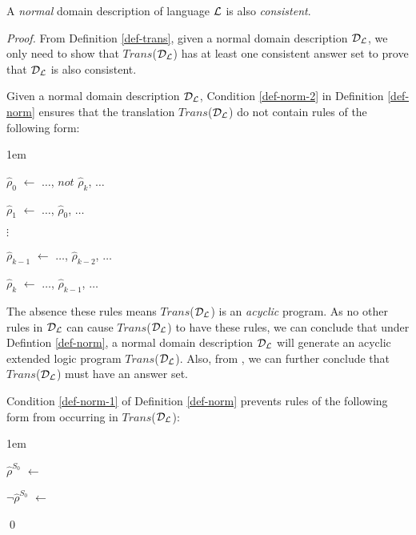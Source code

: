 \documentclass[global,twocolumn,final]{svjour}
\newenvironment{vtheorem}[1]
  {\begin{theorem}[#1]\hspace{0.25em}}
  {\end{theorem}}
\newenvironment{vproof}
  {\begin{proof}\hspace{0.25em}}
  {\qed\end{proof}}
\newenvironment{vquote}
  {\begin{list}{}{\leftmargin 1em}\item[]}
  {\end{list}}
\begin{document}
    \begin{vtheorem}{Domain Consistency}
      \label{the-cons}
      A {\em normal} domain description of language ${\cal L}$ is also
      {\em consistent}.
    \end{vtheorem}

    \begin{vproof}
      From Definition \ref{def-trans}, given a normal domain description
      ${\cal D}_{\cal L}$, we only need to show that
      $Trans$(${\cal D}_{\cal L}$) has at least one consistent answer set to
      prove that ${\cal D}_{\cal L}$ is also consistent.

      Given a normal domain description ${\cal D}_{\cal L}$, Condition
      \ref{def-norm-2} in Definition \ref{def-norm} ensures that the
      translation $Trans$(${\cal D}_{\cal L}$) do not contain rules of the
      following form:

      \begin{vquote}
        $\hat{\rho}_{0}$ $\leftarrow$ $\hdots$, $not$ $\hat{\rho}_{k}$, $\hdots$

        $\hat{\rho}_{1}$ $\leftarrow$ $\hdots$, $\hat{\rho}_{0}$, $\hdots$

        $\vdots$

        $\hat{\rho}_{k - 1}$ $\leftarrow$ $\hdots$, $\hat{\rho}_{k - 2}$, $\hdots$

        $\hat{\rho}_{k}$ $\leftarrow$ $\hdots$, $\hat{\rho}_{k - 1}$, $\hdots$
      \end{vquote}

      The absence these rules means $Trans$(${\cal D}_{\cal L}$) is an
      {\em acyclic} program. As no other rules in ${\cal D}_{\cal L}$ can
      cause $Trans$(${\cal D}_{\cal L}$) to have these rules, we can conclude
      that under Defintion \ref{def-norm}, a normal domain description
      ${\cal D}_{\cal L}$ will generate an acyclic extended logic program
      $Trans$(${\cal D}_{\cal L}$). Also, from \cite{BAR}, we can further
      conclude that $Trans$(${\cal D}_{\cal L}$) must have an answer set.

      Condition \ref{def-norm-1} of Definition \ref{def-norm} prevents rules
      of the following form from occurring in $Trans$(${\cal D}_{\cal L}$):

      \begin{vquote}
        $\hat{\rho}^{S_{0}}$ $\leftarrow$

        $\lnot\hat{\rho}^{S_{0}}$ $\leftarrow$
      \end{vquote}


\end{vproof}
\end{document}
